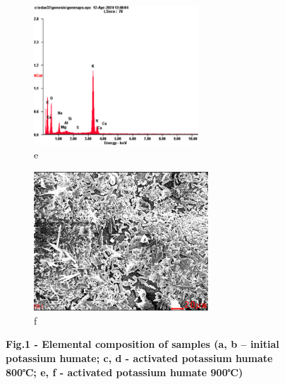 \begin{figure}[H]
    \begin{subfigure}[t]{0.45\textwidth}
        \centering
        \includegraphics[height=5.2cm]{media/chem2/image91}
        \caption*{e}
    \end{subfigure}
    \begin{subfigure}[t]{0.45\textwidth}
        \centering
        \includegraphics[height=5.2cm]{media/chem2/image92}
        \caption*{f}
    \end{subfigure}
    \caption*{{\bfseries Fig.1 - Elemental composition of samples (a, b -- initial potassium humate; c, d - activated potassium humate 800℃; e, f - activated potassium humate 900℃)}}
\end{figure}


